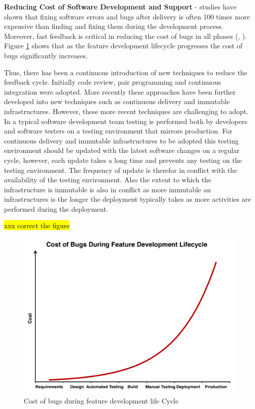 \documentclass[a4paper,11pt,twoside]{report}
\begin{document}
\noindent \textbf{Reducing Cost of Software Development and Support} - studies have shown that fixing software errors and bugs after delivery is often 100 times more expensive than finding and fixing them during the development process. Moreover, fast feedback is critical in reducing the cost of bugs in all phases (\cite{Boehm_a}, \cite{Boehm_b}). Figure \ref{cost} shows that as the feature development lifecycle progresses the cost of bugs significantly increases. 


Thus, there has been a continuous introduction of new techniques to reduce the feedback cycle.  Initially code review, pair programming and continuous integration were adopted.  More recently these approaches have been further developed into new techniques such as continuous delivery and immutable infrastructures.  However, these more recent techniques are challenging to adopt.  In a typical software development team testing is performed both by developers and software testers on a testing environment that mirrors production.  For continuous delivery and immutable infrastructures to be adopted this testing environment should be updated with the latest software changes on a regular cycle, however, each update takes a long time and prevents any testing on the testing environment.  The frequency of update is therefor in conflict with the availability of the testing environment.  Also the extent to which the infrastructure is immutable is also in conflict as more immutable an infrastructures is the longer the deployment typically takes as more activities are performed during the deployment. 

\hl{xxx correct the figure} 
\begin{figure}[!ht]
  \centering
     \includegraphics[scale=0.25]{cost_of_bugs}
  \caption{Cost of bugs during  feature development life Cycle}
  \label{cost}
\end{figure}
\end{document}
